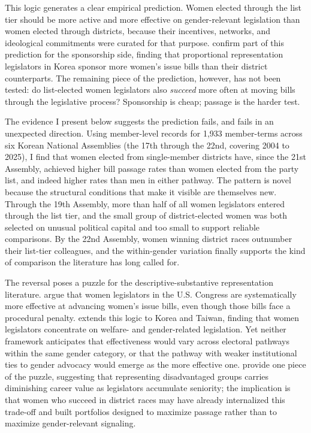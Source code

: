 \documentclass[11pt]{article}
\begin{document}
This logic generates a clear empirical prediction. Women elected through the list tier should be more active and more effective on gender-relevant legislation than women elected through districts, because their incentives, networks, and ideological commitments were curated for that purpose. \citet{kweonRyan2021} confirm part of this prediction for the sponsorship side, finding that proportional representation legislators in Korea sponsor more women's issue bills than their district counterparts. The remaining piece of the prediction, however, has not been tested: do list-elected women legislators also \emph{succeed} more often at moving bills through the legislative process? Sponsorship is cheap; passage is the harder test.

The evidence I present below suggests the prediction fails, and fails in an unexpected direction. Using member-level records for 1,933 member-terms across six Korean National Assemblies (the 17th through the 22nd, covering 2004 to 2025), I find that women elected from single-member districts have, since the 21st Assembly, achieved higher bill passage rates than women elected from the party list, and indeed higher rates than men in either pathway. The pattern is novel because the structural conditions that make it visible are themselves new. Through the 19th Assembly, more than half of all women legislators entered through the list tier, and the small group of district-elected women was both selected on unusual political capital and too small to support reliable comparisons. By the 22nd Assembly, women winning district races outnumber their list-tier colleagues, and the within-gender variation finally supports the kind of comparison the literature has long called for.

The reversal poses a puzzle for the descriptive-substantive representation literature. \citet{voldenWisemanWittmer2016} argue that women legislators in the U.S. Congress are systematically more effective at advancing women's issue bills, even though those bills face a procedural penalty. \citet{shim2021a} extends this logic to Korea and Taiwan, finding that women legislators concentrate on welfare- and gender-related legislation. Yet neither framework anticipates that effectiveness would vary across electoral pathways within the same gender category, or that the pathway with weaker institutional ties to gender advocacy would emerge as the more effective one. \citet{bailerEtAl2021} provide one piece of the puzzle, suggesting that representing disadvantaged groups carries diminishing career value as legislators accumulate seniority; the implication is that women who succeed in district races may have already internalized this trade-off and built portfolios designed to maximize passage rather than to maximize gender-relevant signaling.
\end{document}
